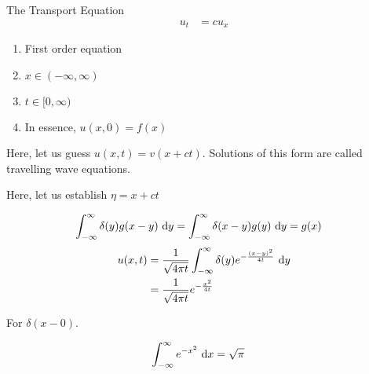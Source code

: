 The Transport Equation
%
\begin{align}
  u_t & = cu_x
\end{align}
\begin{enumerate}
  \item First order equation
  \item $x \in (-\infty, \infty)$
  \item $t \in [0, \infty)$
  \item In essence, $u(x, 0) = f(x)$
\end{enumerate}

Here, let us guess $u(x, t) = v(x + ct)$. Solutions of this form are called travelling wave equations.

Here, let us establish $\eta = x + ct$

%
\begin{align}
  \int^\infty_{-\infty} \delta(y) g(x - y)\ \text dy & = \int^\infty_{-\infty} \delta(x - y) g(y)\ \text dy = g(x)
\end{align}
\newpage
{}
%
\begin{align}
  u(x, t) & = \frac{1}{\sqrt{4 \pi t}} \int^\infty_{-\infty} \delta(y) e^{- \frac{(x - y)^2}{4t}}\ \text dy\\
  & = \frac{1}{\sqrt{4 \pi t}} e^{-\frac{x^2}{4t}}
\end{align}

For $\delta(x - 0)$.

%
\begin{align}
  \int^\infty_{-\infty} e^{-x^2}\ \text dx & = \sqrt \pi
\end{align}
